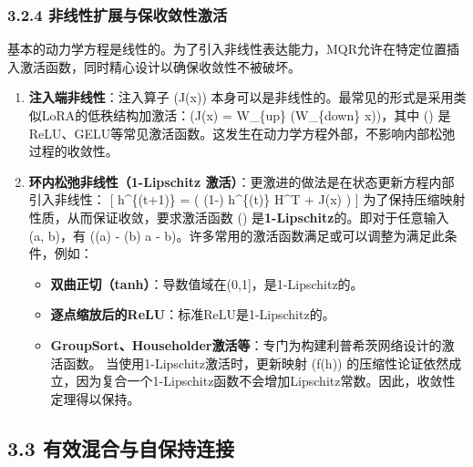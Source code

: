 \documentclass[
  12pt,
]{article}
\providecommand{\tightlist}{%
  \setlength{\itemsep}{0pt}\setlength{\parskip}{0pt}}
\begin{document}
\hypertarget{ux975eux7ebfux6027ux6269ux5c55ux4e0eux4fddux6536ux655bux6027ux6fc0ux6d3b}{%
\subsubsection{3.2.4
非线性扩展与保收敛性激活}\label{ux975eux7ebfux6027ux6269ux5c55ux4e0eux4fddux6536ux655bux6027ux6fc0ux6d3b}}

基本的动力学方程是线性的。为了引入非线性表达能力，MQR允许在特定位置插入激活函数，同时精心设计以确保收敛性不被破坏。

\begin{enumerate}
\def\labelenumi{\arabic{enumi}.}
\item
  \textbf{注入端非线性}：注入算子 (J(x))
  本身可以是非线性的。最常见的形式是采用类似LoRA的低秩结构加激活：(J(x)
  = W\_\{up\} \cdot \sigma(W\_\{down\} \cdot x))，其中 (\sigma)
  是ReLU、GELU等常见激活函数。这发生在动力学方程外部，不影响内部松弛过程的收敛性。
\item
  \textbf{环内松弛非线性（1-Lipschitz
  激活）}：更激进的做法是在状态更新方程内部引入非线性： {[}
  h\^{}\{(t+1)\} = \sigma\left( (1-\alpha) h\^{}\{(t)\} H\^{}T +
  \alpha J(x) \right) {]}
  为了保持压缩映射性质，从而保证收敛，要求激活函数 (\sigma)
  是\textbf{1-Lipschitz}的。即对于任意输入 (a, b)，有
  (\textbar{}\sigma(a) - \sigma(b)\textbar{} \leq \textbar a -
  b\textbar)。许多常用的激活函数满足或可以调整为满足此条件，例如：

  \begin{itemize}
  \tightlist
  \item
    \textbf{双曲正切（tanh）}：导数值域在(0,1{]}，是1-Lipschitz的。
  \item
    \textbf{逐点缩放后的ReLU}：标准ReLU是1-Lipschitz的。
  \item
    \textbf{GroupSort、Householder激活等}：专门为构建利普希茨网络设计的激活函数。
    当使用1-Lipschitz激活时，更新映射 (f(h))
    的压缩性论证依然成立，因为复合一个1-Lipschitz函数不会增加Lipschitz常数。因此，收敛性定理得以保持。
  \end{itemize}
\end{enumerate}

\hypertarget{ux6709ux6548ux6df7ux5408ux4e0eux81eaux4fddux6301ux8fdeux63a5}{%
\subsection{3.3
有效混合与自保持连接}\label{ux6709ux6548ux6df7ux5408ux4e0eux81eaux4fddux6301ux8fdeux63a5}}
\end{document}
